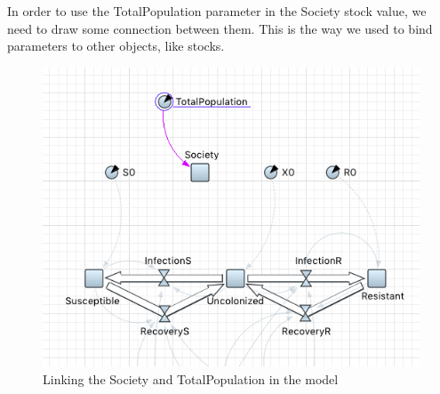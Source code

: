 In order to use the TotalPopulation parameter in the Society stock value, we need to draw some connection between them. This is the way we used to bind parameters to other objects, like stocks.

\begin{figure}[H]
  \centering
  \includegraphics[height=0.5\textwidth]{img/screens/society/society3}
  \caption{Linking the Society and TotalPopulation in the model}
\end{figure}
